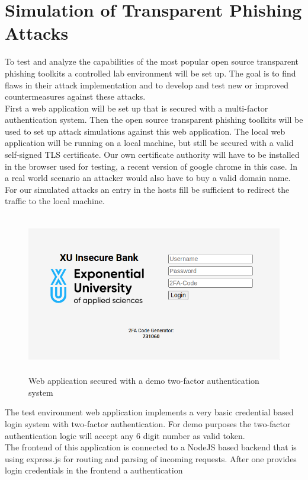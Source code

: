 \documentclass[12pt]{report}
\begin{document}
\section{Simulation of Transparent Phishing Attacks}
To test and analyze the capabilities of the most popular open source transparent phishing toolkits
a controlled lab environment will be set up. The goal is to find flaws in their attack implementation
and to develop and test new or improved countermeasures against these attacks.\\
First a web application will be set up that is secured with a multi-factor authentication system.
Then the open source transparent phishing toolkits will be used to set up attack simulations against
this web application. The local web application will be running on a local machine, but still be secured
with a valid self-signed TLS certificate. Our own certificate authority will have to be installed in the
browser used for testing, a recent version of google chrome in this case. In a real world scenario an attacker
would also have to buy a valid domain name. For our simulated attacks an entry in the hosts fill be sufficient
to redirect the traffic to the local machine.\\
\begin{figure}[!htb]
  \centering
  \includegraphics[height=7cm]{./images/2fa_app.png}
  \caption{Web application secured with a demo two-factor authentication system}
\end{figure}
The test environment web application implements a very basic credential based login system with two-factor
authentication. For demo purposes the two-factor authentication logic will accept any 6 digit number as
valid token.\\The frontend of this application is connected to a NodeJS based backend that is using express.js
for routing and parsing of incoming requests. After one provides login credentials in the frontend a authentication
\end{document}
